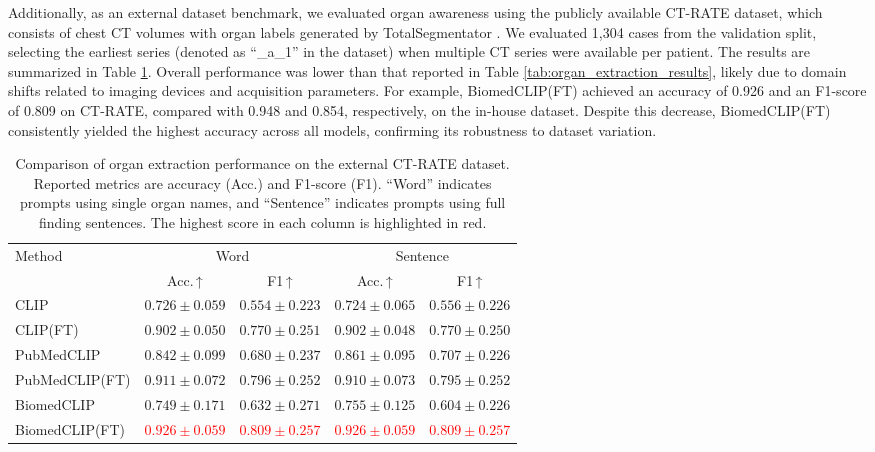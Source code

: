 \documentclass[bioengineering,article,submit,pdftex,moreauthors]{Definitions/mdpi}
\begin{document}
Additionally, as an external dataset benchmark, we evaluated organ awareness using the publicly available CT-RATE dataset, which consists of chest CT volumes with organ labels generated by TotalSegmentator \cite{hamamci_ct2rep_2024}. 
We evaluated 1,304 cases from the validation split, selecting the earliest series (denoted as “\_a\_1” in the dataset) when multiple CT series were available per patient. 
The results are summarized in Table \ref{tab:organ_extraction_results_ctrate}. 
Overall performance was lower than that reported in Table \ref{tab:organ_extraction_results}, likely due to domain shifts related to imaging devices and acquisition parameters. 
For example, BiomedCLIP(FT) achieved an accuracy of 0.926 and an F1-score of 0.809 on CT-RATE, compared with 0.948 and 0.854, respectively, on the in-house dataset. 
Despite this decrease, BiomedCLIP(FT) consistently yielded the highest accuracy across all models, confirming its robustness to dataset variation.



\begin{table}[ht]
  \centering
  \caption{Comparison of organ extraction performance on the external CT-RATE dataset. 
  Reported metrics are accuracy (Acc.) and F1-score (F1). 
  “Word” indicates prompts using single organ names, and “Sentence” indicates prompts using full finding sentences. 
  The highest score in each column is highlighted in red.}
  \label{tab:organ_extraction_results_ctrate}
  \begin{tabular}{lcccc}
    \toprule
    \multirow{2}{*}{Method} & \multicolumn{2}{c}{Word}               & \multicolumn{2}{c}{Sentence}           \\
    \cmidrule(lr){2-3}\cmidrule(lr){4-5}
                          & Acc.\,↑ & F1\,↑         & Acc.\,↑   & F1\,↑         \\ 
    \midrule
    CLIP                    & $0.726\pm0.059$ & $0.554\pm0.223$ & $0.724\pm0.065$ & $0.556\pm0.226$ \\
    CLIP(FT)                & $0.902\pm0.050$ & $0.770\pm0.251$ & $0.902\pm0.048$ & $0.770\pm0.250$ \\
    PubMedCLIP              & $0.842\pm0.099$ & $0.680\pm0.237$ & $0.861\pm0.095$ & $0.707\pm0.226$ \\
    PubMedCLIP(FT)          & $0.911\pm0.072$ & $0.796\pm0.252$ & $0.910\pm0.073$ & $0.795\pm0.252$ \\
    BiomedCLIP              & $0.749\pm0.171$ & $0.632\pm0.271$ & $0.755\pm0.125$ & $0.604\pm0.226$ \\
    BiomedCLIP(FT)          & \textcolor{red}{$0.926\pm0.059$} & \textcolor{red}{$0.809\pm0.257$} & \textcolor{red}{$0.926\pm0.059$} & \textcolor{red}{$0.809\pm0.257$} \\
    \bottomrule
  \end{tabular}
\end{table}
\end{document}
